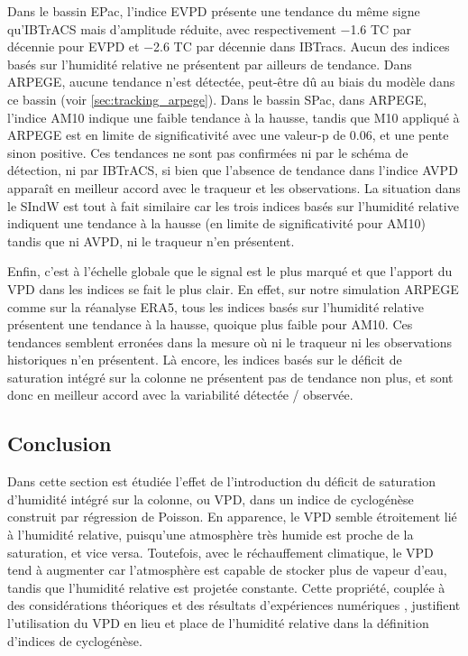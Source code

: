 \documentclass[../main.tex]{subfiles}
\begin{document}
Dans le bassin EPac, l'indice EVPD présente une tendance du même signe qu'IBTrACS mais d'amplitude réduite, avec respectivement \num{-1.6} TC par décennie pour
EVPD et \num{-2.6} TC par décennie dans IBTracs. Aucun des indices basés sur l'humidité relative ne présentent par ailleurs de tendance. Dans ARPEGE, aucune
tendance n'est détectée, peut-être dû au biais du modèle dans ce bassin (voir \cref{sec:tracking_arpege}). Dans le bassin SPac, dans ARPEGE, l'indice AM10
indique une faible tendance à la hausse, tandis que M10 appliqué à ARPEGE est en limite de significativité avec une valeur-p de \num{0.06}, et une pente sinon
positive. Ces tendances ne sont pas confirmées ni par le schéma de détection, ni par IBTrACS, si bien que l'absence de tendance dans l'indice AVPD apparaît en
meilleur accord avec le traqueur et les observations. La situation dans le SIndW est tout à fait similaire car les trois indices basés sur l'humidité relative
indiquent une tendance à la hausse (en limite de significativité pour AM10) tandis que ni AVPD, ni le traqueur n'en présentent.

Enfin, c'est à l'échelle globale que le signal est le plus marqué et que l'apport du VPD dans les indices se fait le plus clair. En effet, sur notre simulation
ARPEGE comme sur la réanalyse ERA5, tous les indices basés sur l'humidité relative présentent une tendance à la hausse, quoique plus faible pour AM10. Ces
tendances semblent erronées dans la mesure où ni le traqueur ni les observations historiques n'en présentent. Là encore, les indices basés sur le déficit de
saturation intégré sur la colonne ne présentent pas de tendance non plus, et sont donc en meilleur accord avec la variabilité détectée / observée.

\subsection{Conclusion}

Dans cette section est étudiée l'effet de l'introduction du déficit de saturation d'humidité intégré sur la colonne, ou VPD, dans un indice de cyclogénèse
construit par régression de Poisson. En apparence, le VPD semble étroitement lié à l'humidité relative, puisqu'une atmosphère très humide est proche de la
saturation, et vice versa. Toutefois, avec le réchauffement climatique, le VPD tend à augmenter car l'atmosphère est capable de stocker plus de vapeur d'eau, tandis
que l'humidité relative est projetée constante. Cette propriété, couplée à des considérations théoriques et des résultats d'expériences numériques
\parencite{emanuel_hurricanes_2008,camargo_testing_2014}, justifient l'utilisation du VPD en lieu et place de l'humidité relative dans la définition d'indices de
cyclogénèse.
\end{document}
